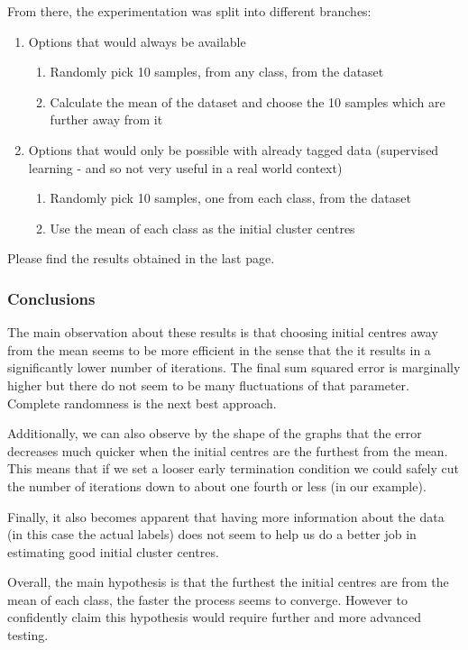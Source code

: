 \documentclass{article}
\begin{document}
From there, the experimentation was split into different branches:
\begin{enumerate}[]
    \item Options that would always be available
    \begin{enumerate}
        \item Randomly pick 10 samples, from any class, from the dataset
        \item Calculate the mean of the dataset and choose the 10 samples which are further     away from it
    \end{enumerate}
    \item Options that would only be possible with already tagged data (supervised learning - and so not very useful in a real world context)
        \begin{enumerate}
        \item Randomly pick 10 samples, one from each class, from the dataset
        \item Use the mean of each class as the initial cluster centres
    \end{enumerate}
\end{enumerate}

Please find the results obtained in the last page.

\subsubsection*{Conclusions}

The main observation about these results is that choosing initial centres away from the mean seems to be more efficient in the sense that the it results in a significantly lower number of iterations. The final sum squared error is marginally higher but there do not seem to be many fluctuations of that parameter. Complete randomness is the next best approach. \par
Additionally, we can also observe by the shape of the graphs that the error decreases much quicker when the initial centres are the furthest from the mean. This means that if we set a looser early termination condition we could safely cut the number of iterations down to about one fourth or less (in our example). \par
Finally, it also becomes apparent that having more information about the data (in this case the actual labels) does not seem to help us do a better job in estimating good initial cluster centres. \par
Overall, the main hypothesis is that the furthest the initial centres are from the mean of each class, the faster the process seems to converge. However to confidently claim this hypothesis would require further and more advanced testing.
\end{document}
